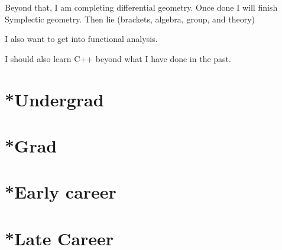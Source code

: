 Beyond that, I am completing differential geometry. Once done I will finish Symplectic geometry. Then lie (brackets, algebra, group, and theory)

I also want to get into functional analysis.

I should also learn C++ beyond what I have done in the past.
\section{*Undergrad}

\section{*Grad}

\section{*Early career}

\section{*Late Career}
